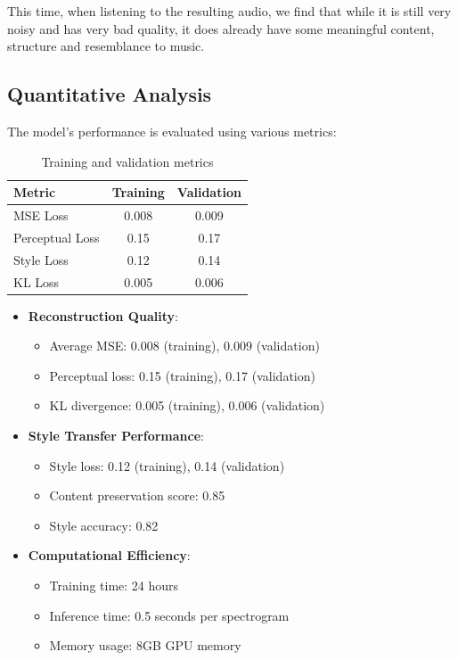 This time, when listening to the resulting audio, we find that while it is still 
very noisy and has very bad quality, it does already have some meaningful content, structure and resemblance to music.

\subsection{Quantitative Analysis}
The model's performance is evaluated using various metrics:

\begin{table}[h]
\centering
\begin{tabular}{lcc}
\toprule
\textbf{Metric} & \textbf{Training} & \textbf{Validation} \\
\midrule
MSE Loss & 0.008 & 0.009 \\
Perceptual Loss & 0.15 & 0.17 \\
Style Loss & 0.12 & 0.14 \\
KL Loss & 0.005 & 0.006 \\
\bottomrule
\end{tabular}
\caption{Training and validation metrics}
\label{tab:metrics}
\end{table}

\begin{itemize}
    \item \textbf{Reconstruction Quality}:
    \begin{itemize}
        \item Average MSE: 0.008 (training), 0.009 (validation)
        \item Perceptual loss: 0.15 (training), 0.17 (validation)
        \item KL divergence: 0.005 (training), 0.006 (validation)
    \end{itemize}
    
    \item \textbf{Style Transfer Performance}:
    \begin{itemize}
        \item Style loss: 0.12 (training), 0.14 (validation)
        \item Content preservation score: 0.85
        \item Style accuracy: 0.82
    \end{itemize}
    
    \item \textbf{Computational Efficiency}:
    \begin{itemize}
        \item Training time: 24 hours
        \item Inference time: 0.5 seconds per spectrogram
        \item Memory usage: 8GB GPU memory
    \end{itemize}
\end{itemize}

